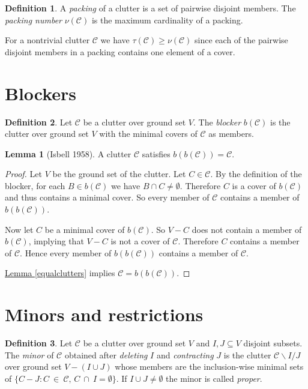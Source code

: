 \documentclass[a4paper, 12pt, twoside=false]{scrbook}
\theoremstyle{definition}
\newtheorem*{definition}{Definition}
\newtheorem{lemma}[theorem]{Lemma}
\begin{document}
\begin{definition}
    A \emph{packing} of a clutter is a set of pairwise disjoint members.
    The \emph{packing number} $\nu(\mathcal{C})$ is the maximum cardinality of a packing.
\end{definition}

For a nontrivial clutter $\mathcal{C}$ we have $\tau(\mathcal{C}) \geq \nu(\mathcal{C})$ since each of the pairwise disjoint members in a packing contains one element of a cover.

\section{Blockers}
\begin{definition}
    Let $\mathcal{C}$ be a clutter over ground set $V$.
    The \emph{blocker} $b(\mathcal{C})$ is the clutter over ground set $V$ with the minimal covers of $\mathcal{C}$ as members.
\end{definition}

\begin{lemma}[Isbell 1958]
    A clutter $\mathcal{C}$ satisfies $b(b(\mathcal{C}))=\mathcal{C}$.
\end{lemma}

\begin{proof}
    Let $V$ be the ground set of the clutter.
    Let $C \in \mathcal{C}$.
    By the definition of the blocker, for each $B \in b(\mathcal{C})$ we have $B\cap C \neq \emptyset$.
    Therefore $C$ is a cover of $b(\mathcal{C})$ and thus contains a minimal cover.
    So every member of $\mathcal{C}$ contains a member of $b(b(\mathcal{C}))$.

    Now let $C$ be a minimal cover of $b(\mathcal{C})$.
    So $V-C$ does not contain a member of $b(\mathcal{C})$, implying that $V-C$ is not a cover of $\mathcal{C}$.
    Therefore $C$ contains a member of $\mathcal{C}$.
    Hence every member of $b(b(\mathcal{C}))$ contains a member of $\mathcal{C}$.

    \hyperref[equalclutters]{Lemma \ref*{equalclutters}} implies $\mathcal{C}=b(b(\mathcal{C}))$.
\end{proof}


\section{Minors and restrictions}
\begin{definition}
    Let $\mathcal{C}$ be a clutter over ground set $V$ and $I, J \subseteq V$ disjoint subsets.
    The \emph{minor} of $\mathcal{C}$ obtained after \emph{deleting} $I$ and \emph{contracting} $J$ is the clutter $\mathcal{C} \backslash I / J$ over ground set $V - (I \cup J)$ whose members are the inclusion-wise minimal sets of $\{C-J : C~\in~\mathcal{C},\, C~\cap~I = \emptyset\}$.
    If $I \cup J \neq \emptyset$ the minor is called \emph{proper}.
\end{definition}
\end{document}

